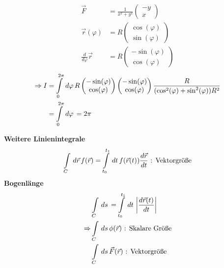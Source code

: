 \begin{Beispiel}
\begin{align*}
\vec{F} &= \frac{1}{x^2+y^2}\begin{pmatrix}-y \\ x\end{pmatrix}\\
\vec{r}(\varphi) &= R\begin{pmatrix}\cos(\varphi) \\ \sin(\varphi)
\end{pmatrix}\\
\frac{d}{d\varphi}\vec{r} &= R \begin{pmatrix}-\sin(\varphi) \\ \cos(\varphi)
\end{pmatrix}
\end{align*}
\begin{align*}
\Rightarrow I &= \int \limits_{0}^{2\pi} \,d\varphi\, R \begin{pmatrix}-\sin(\varphi) \\ \cos(\varphi)
\end{pmatrix} \begin{pmatrix}-\sin(\varphi) \\ \cos(\varphi)
\end{pmatrix} \frac{R}{(\cos^2(\varphi)+\sin^2(\varphi))R^2}\\
&= \int \limits_{0}^{2\pi} \,d\varphi\, = 2\pi
\end{align*}
\end{Beispiel}

\begin{Bemerkung}{\bf Weitere Linienintegrale}
\begin{align*}
\int \limits_{C} \,d\vec{r}\, f(\vec{r}) = \int \limits_{t_0}^{t_1} \,dt\,
f(\vec{r}(t)) \frac{d\vec{r}}{dt} \text{ : Vektorgröße}
\end{align*}
{\bf Bogenlänge}
\begin{align*}
&\int \limits_{C} \,ds\, = \int \limits_{t_0}^{t_1} \,dt\,
\left|\frac{d\vec{r}(t)}{dt}\right|\\ \Rightarrow  &\int \limits_{C} \,ds\,
\phi(\vec{r})
\text{ : Skalare Größe}\\ &\int \limits_{C} \,ds\, \vec{F}(\vec{r}) \text{ : Vektorgröße}
\end{align*}
\end{Bemerkung}

